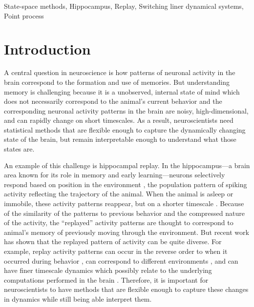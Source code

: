 \documentclass[conference]{IEEEtran}
\begin{document}
\begin{IEEEkeywords}
State-space methods, Hippocampus, Replay, Switching liner dynamical systems, Point process
\end{IEEEkeywords}

\section{Introduction}
A central question in neuroscience is how patterns of neuronal activity in the brain correspond to the formation and use of memories. But understanding memory is challenging because it is a unobserved, internal state of mind which does not necessarily correspond to the animal’s current behavior and the corresponding neuronal activity patterns in the brain are noisy, high-dimensional, and can rapidly change on short timescales. As a result, neuroscientists need statistical methods that are flexible enough to capture the dynamically changing state of the brain, but remain interpretable enough to understand what those states are.

An example of this challenge is hippocampal replay. In the hippocampus---a brain area known for its role in memory and early learning---neurons selectively respond based on position in the environment \cite{OKeefehippocampusspatialmap1971}, the population pattern of spiking activity reflecting the trajectory of the animal. When the animal is asleep or immobile, these activity patterns reappear, but on a shorter timescale \cite{WilsonReactivationhippocampalensemble1994, NadasdyReplayTimeCompression1999}. Because of the similarity of the patterns to previous behavior and the compressed nature of the activity, the “replayed” activity patterns are thought to correspond to animal's memory of previously moving through the environment. But recent work has shown that the replayed pattern of activity can be quite diverse. For example, replay activity patterns can occur in the reverse order to when it occurred during behavior \cite{FosterReversereplaybehavioural2006, DibaForwardreversehippocampal2007}, can correspond to different environments \cite{KarlssonAwakereplayremote2009}, and can have finer timescale dynamics which possibly relate to the underlying computations performed in the brain \cite{PfeifferAutoassociativedynamicsgeneration2015}. Therefore, it is important for neuroscientists to have methods that are flexible enough to capture these changes in dynamics while still being able interpret them.
\end{document}
